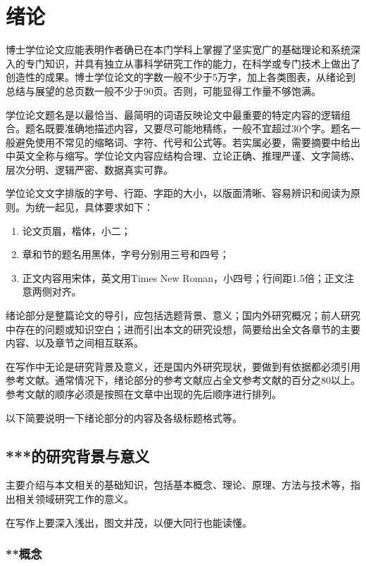 
\chapter{绪论}
\label{cha:intro}

博士学位论文应能表明作者确已在本门学科上掌握了坚实宽广的基础理论和系统深入的专门知识，并具有独立从事科学研究工作的能力，在科学或专门技术上做出了创造性的成果。博士学位论文的字数一般不少于5万字，加上各类图表，从绪论到总结与展望的总页数一般不少于90页。否则，可能显得工作量不够饱满。

学位论文题名是以最恰当、最简明的词语反映论文中最重要的特定内容的逻辑组合。题名既要准确地描述内容，又要尽可能地精练，一般不宜超过30个字。题名一般避免使用不常见的缩略词、字符、代号和公式等。若实属必要，需要摘要中给出中英文全称与缩写。学位论文内容应结构合理、立论正确、推理严谨、文字简练、层次分明、逻辑严密、数据真实可靠。

学位论文文字排版的字号、行距、字距的大小，以版面清晰、容易辨识和阅读为原则。为统一起见，具体要求如下：
\begin{enumerate}
    \item 论文页眉，楷体，小二；
    \item 章和节的题名用黑体，字号分别用三号和四号；
    \item 正文内容用宋体，英文用Times New Roman，小四号；行间距1.5倍；正文注意两侧对齐。
\end{enumerate}

绪论部分是整篇论文的导引，应包括选题背景、意义；国内外研究概况；前人研究中存在的问题或知识空白；进而引出本文的研究设想，简要给出全文各章节的主要内容、以及章节之间相互联系。

在写作中无论是研究背景及意义，还是国内外研究现状，要做到有依据都必须引用参考文献。通常情况下，绪论部分的参考文献应占全文参考文献的百分之80以上。参考文献的顺序必须是按照在文章中出现的先后顺序进行排列。

以下简要说明一下绪论部分的内容及各级标题格式等。


\section{***的研究背景与意义}
\label{sec:general intro}
主要介绍与本文相关的基础知识，包括基本概念、理论、原理、方法与技术等，指出相关领域研究工作的意义。

在写作上要深入浅出，图文并茂，以便大同行也能读懂。


\subsection{**概念}




